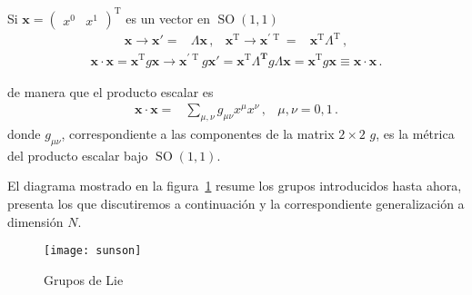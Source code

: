 \begin{frame}
  Si $\boldsymbol{x}=
  \begin{pmatrix}
    x^0& x^1
  \end{pmatrix}^{\operatorname{T}}
$ es un vector en $\operatorname{SO}(1,1)$
\begin{align}
  \boldsymbol{x}\to \boldsymbol{x}'=&\Lambda \boldsymbol{x}\,,&
  \boldsymbol{x}^{\operatorname{T}}\to \boldsymbol{x}^{\prime {\operatorname{T}}}=& \boldsymbol{x}^{\operatorname{T}} \Lambda^{\operatorname{T}}\,,
\end{align}
\begin{align}
  \label{eq:psso11}
  \boldsymbol{x}\cdot \boldsymbol{x}= \boldsymbol{x}^{\operatorname{T}}g \boldsymbol{x}\to \boldsymbol{x}^{\prime\operatorname{T}}g \boldsymbol{x}'
  =\boldsymbol{x}^{\operatorname{T}}\Lambda^{\boldsymbol{T}}g \Lambda \boldsymbol{x}=\boldsymbol{x}^{\operatorname{T}}g \boldsymbol{x}\equiv  \boldsymbol{x}\cdot \boldsymbol{x}\,.
\end{align}
\end{frame}
de manera que el producto escalar es
\begin{align}
  \boldsymbol{x}\cdot \boldsymbol{x}=&\sum_{\mu,\nu}g_{\mu\nu}x^{\mu}x^{\nu}\,,& \mu,\nu=0,1\,.
\end{align}
donde $g_{\mu\nu}$, correspondiente a las componentes de la matrix $2\times2$ $g$, es la métrica del producto
escalar bajo $\operatorname{SO}(1,1)$.

El diagrama mostrado en la figura~\ref{fig:sunson} resume los grupos introducidos hasta ahora, presenta los que discutiremos a continuación y la correspondiente generalización a dimensión $N$.
\begin{frame}
\begin{figure}
  \centering
  \texttt{[image: sunson]}
  \caption{Grupos de Lie}
  \label{fig:sunson}
\end{figure}
\end{frame}



